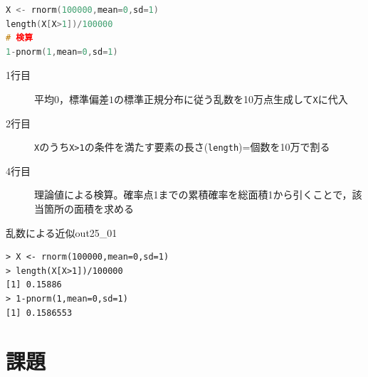 \documentclass{ltjsarticle}
\begin{document}
\begin{lstlisting}[language=c++,label={code:25_01},caption={近似値と検算}]
X <- rnorm(100000,mean=0,sd=1)
length(X[X>1])/100000
# 検算
1-pnorm(1,mean=0,sd=1)
\end{lstlisting}
\begin{description}
	\item[1行目] 平均$0$，標準偏差$1$の標準正規分布に従う乱数を10万点生成して\texttt{X}に代入
	\item[2行目] \texttt{X}のうち\texttt{X>1}の条件を満たす要素の長さ(\texttt{length})=個数を10万で割る
	\item[4行目] 理論値による検算。確率点1までの累積確率を総面積1から引くことで，該当箇所の面積を求める
\end{description}

\begin{Rscreen}{乱数による近似}{out25_01}
	\begin{verbatim}
> X <- rnorm(100000,mean=0,sd=1)
> length(X[X>1])/100000
[1] 0.15886
> 1-pnorm(1,mean=0,sd=1)
[1] 0.1586553\end{verbatim}
\end{Rscreen}
\section{課題}
\end{document}
